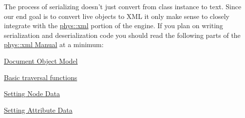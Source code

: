 The process of serializing doesn't just convert from class instance to text. Since our end goal is to convert live objects to XML it only make sense to closely integrate with the \hyperlink{namespacephys_1_1xml}{phys::xml} portion of the engine. If you plan on writing serialization and deserialization code you should read the following parts of the \hyperlink{XMLManual}{phys::xml Manual} at a minimum:
\begin{DoxyItemize}
\item \hyperlink{XMLManual_XMLDOM}{Document Object Model}
\item \hyperlink{XMLManual_XMLAccessingBasics}{Basic traversal functions}
\item \hyperlink{XMLManual_XMLModifyingNodeData}{Setting Node Data}
\item \hyperlink{XMLManual_XMLModifyingAttributeData}{Setting Attribute Data}
\end{DoxyItemize}

